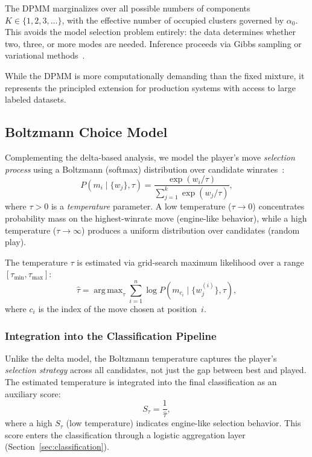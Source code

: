\documentclass[11pt,a4paper]{article}
\DeclareMathOperator*{\argmax}{arg\,max}
\begin{document}
The DPMM marginalizes over all possible numbers of components
$K \in \{1, 2, 3, \ldots\}$, with the effective number of occupied clusters
governed by $\alpha_0$. This avoids the model selection problem entirely:
the data determines whether two, three, or more modes are needed.
Inference proceeds via Gibbs sampling or variational
methods~\citep{blei2006variational}.

While the DPMM is more computationally demanding than the fixed mixture,
it represents the principled extension for production systems with access to
large labeled datasets.


\subsection{Boltzmann Choice Model}
\label{sec:softmax}

Complementing the delta-based analysis, we model the player's move
\emph{selection process} using a Boltzmann (softmax) distribution over
candidate winrates~\citep{luce1959individual}:
\begin{equation}
    P(m_i \mid \{w_j\}, \tau) = \frac{\exp(w_i / \tau)}{\sum_{j=1}^{k}
    \exp(w_j / \tau)},
    \label{eq:softmax}
\end{equation}
where $\tau > 0$ is a \emph{temperature} parameter. A low temperature
($\tau \to 0$) concentrates probability mass on the highest-winrate move
(engine-like behavior), while a high temperature ($\tau \to \infty$) produces
a uniform distribution over candidates (random play).

The temperature $\tau$ is estimated via grid-search maximum likelihood over
a range $[\tau_{\min}, \tau_{\max}]$:
\begin{equation}
    \hat{\tau} = \argmax_{\tau} \sum_{i=1}^{n} \log P(m_{c_i} \mid
    \{w_j^{(i)}\}, \tau),
    \label{eq:tau_mle}
\end{equation}
where $c_i$ is the index of the move chosen at position~$i$.

\subsubsection{Integration into the Classification Pipeline}

Unlike the delta model, the Boltzmann temperature captures the player's
\emph{selection strategy} across all candidates, not just the gap between
best and played. The estimated temperature is integrated into the final
classification as an auxiliary score:
\begin{equation}
    S_{\tau} = \frac{1}{\hat{\tau}},
    \label{eq:tau_score}
\end{equation}
where a high $S_{\tau}$ (low temperature) indicates engine-like selection
behavior. This score enters the classification through a logistic
aggregation layer (Section~\ref{sec:classification}).
\end{document}
